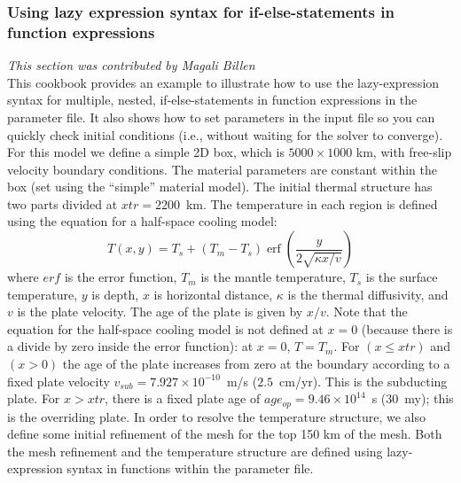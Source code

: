 \documentclass{article}
\DeclareMathOperator{\erf}{erf}
\begin{document}
\subsubsection{Using lazy expression syntax for if-else-statements in function expressions}
\label{sec:lazy-expression}
\textit{This section was contributed by Magali Billen}\\
This cookbook provides an example to illustrate how to use the lazy-expression syntax for multiple, nested, if-else-statements in function expressions in the parameter file. It also shows how to set parameters in the input file so you can quickly check initial conditions (i.e., without waiting for the solver to converge).  For this model we define a simple 2D box, which is $5000 \times 1000$ km, with free-slip velocity boundary conditions. The material parameters are constant within the box (set using the  ``simple'' material model). The initial thermal structure has two parts divided at $xtr=2200$~km. The temperature in each region is defined using the equation for a half-space cooling model:
\begin{equation}
T(x,y) = T_s + (T_m  - T_s) \erf{(\frac{y}{2\sqrt{\kappa x/v}})}
\end{equation}
where $erf$ is the error function, $T_m$ is the mantle temperature, $T_s$ is the surface temperature, $y$ is depth, $x$ is horizontal distance, $\kappa$ is the thermal diffusivity, and $v$ is the plate velocity. The age of the plate is given by $x/v$. Note that the equation for the half-space cooling model is not defined at $x=0$ (because there is a divide by zero inside the error function): at $x=0$, $T=T_m$.  For $(x \le xtr)$ and $(x>0)$ the age of the plate increases from zero at the boundary according to a fixed plate velocity $v_{sub}=7.927\times10^{-10}$~m/s  ($2.5$~cm/yr). This is the subducting plate. For $x > xtr$, there is a fixed plate age of $age_{op}=9.46\times10^{14}$~s ($30$~my); this is the overriding plate. In order to resolve the temperature structure, we also define some initial refinement of the mesh for the top 150 km of the mesh. Both the mesh refinement and the temperature structure are defined using lazy-expression syntax in functions within the parameter file.
\end{document}
